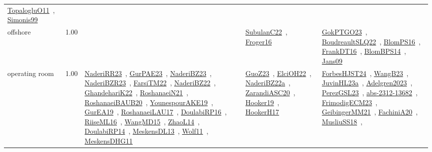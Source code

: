 {\begin{longtable}{p{3cm}r>{\raggedright\arraybackslash}p{6cm}>{\raggedright\arraybackslash}p{6cm}>{\raggedright\arraybackslash}p{8cm}}
\href{../works/TopalogluO11.pdf}{TopalogluO11}~\cite{TopalogluO11}, \href{../works/Simonis99.pdf}{Simonis99}~\cite{Simonis99}\\
\index{offshore}\index{ApplicationAreas!offshore}offshore &  1.00 &  & \href{../works/SubulanC22.pdf}{SubulanC22}~\cite{SubulanC22}, \href{../works/Froger16.pdf}{Froger16}~\cite{Froger16} & \href{../works/GokPTGO23.pdf}{GokPTGO23}~\cite{GokPTGO23}, \href{../works/BoudreaultSLQ22.pdf}{BoudreaultSLQ22}~\cite{BoudreaultSLQ22}, \href{../works/BlomPS16.pdf}{BlomPS16}~\cite{BlomPS16}, \href{../works/FrankDT16.pdf}{FrankDT16}~\cite{FrankDT16}, \href{../works/BlomBPS14.pdf}{BlomBPS14}~\cite{BlomBPS14}, \href{../works/Jans09.pdf}{Jans09}~\cite{Jans09}\\
\index{operating room}\index{ApplicationAreas!operating room}operating room &  1.00 & \href{../works/NaderiRR23.pdf}{NaderiRR23}~\cite{NaderiRR23}, \href{../works/GurPAE23.pdf}{GurPAE23}~\cite{GurPAE23}, \href{../works/NaderiBZ23.pdf}{NaderiBZ23}~\cite{NaderiBZ23}, \href{../works/NaderiBZR23.pdf}{NaderiBZR23}~\cite{NaderiBZR23}, \href{../works/FarsiTM22.pdf}{FarsiTM22}~\cite{FarsiTM22}, \href{../works/NaderiBZ22.pdf}{NaderiBZ22}~\cite{NaderiBZ22}, \href{../works/GhandehariK22.pdf}{GhandehariK22}~\cite{GhandehariK22}, \href{../works/RoshanaeiN21.pdf}{RoshanaeiN21}~\cite{RoshanaeiN21}, \href{../works/RoshanaeiBAUB20.pdf}{RoshanaeiBAUB20}~\cite{RoshanaeiBAUB20}, \href{../works/YounespourAKE19.pdf}{YounespourAKE19}~\cite{YounespourAKE19}, \href{../works/GurEA19.pdf}{GurEA19}~\cite{GurEA19}, \href{../works/RoshanaeiLAU17.pdf}{RoshanaeiLAU17}~\cite{RoshanaeiLAU17}, \href{../works/DoulabiRP16.pdf}{DoulabiRP16}~\cite{DoulabiRP16}, \href{../works/RiiseML16.pdf}{RiiseML16}~\cite{RiiseML16}, \href{../works/WangMD15.pdf}{WangMD15}~\cite{WangMD15}, \href{../works/ZhaoL14.pdf}{ZhaoL14}~\cite{ZhaoL14}, \href{../works/DoulabiRP14.pdf}{DoulabiRP14}~\cite{DoulabiRP14}, \href{../works/MeskensDL13.pdf}{MeskensDL13}~\cite{MeskensDL13}, \href{../works/Wolf11.pdf}{Wolf11}~\cite{Wolf11}, \href{../works/MeskensDHG11.pdf}{MeskensDHG11}~\cite{MeskensDHG11} & \href{../works/GuoZ23.pdf}{GuoZ23}~\cite{GuoZ23}, \href{../works/ElciOH22.pdf}{ElciOH22}~\cite{ElciOH22}, \href{../works/NaderiBZ22a.pdf}{NaderiBZ22a}~\cite{NaderiBZ22a}, \href{../works/ZarandiASC20.pdf}{ZarandiASC20}~\cite{ZarandiASC20}, \href{../works/Hooker19.pdf}{Hooker19}~\cite{Hooker19}, \href{../works/HookerH17.pdf}{HookerH17}~\cite{HookerH17} & \href{../works/ForbesHJST24.pdf}{ForbesHJST24}~\cite{ForbesHJST24}, \href{../works/WangB23.pdf}{WangB23}~\cite{WangB23}, \href{../works/JuvinHL23a.pdf}{JuvinHL23a}~\cite{JuvinHL23a}, \href{../works/Adelgren2023.pdf}{Adelgren2023}~\cite{Adelgren2023}, \href{../works/PerezGSL23.pdf}{PerezGSL23}~\cite{PerezGSL23}, \href{../works/abs-2312-13682.pdf}{abs-2312-13682}~\cite{abs-2312-13682}, \href{../works/FrimodigECM23.pdf}{FrimodigECM23}~\cite{FrimodigECM23}, \href{../works/GeibingerMM21.pdf}{GeibingerMM21}~\cite{GeibingerMM21}, \href{../works/FachiniA20.pdf}{FachiniA20}~\cite{FachiniA20}, \href{../works/MusliuSS18.pdf}{MusliuSS18}~\cite{MusliuSS18}, 
\end{longtable}}
